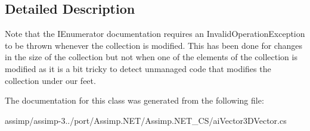 \subsection{Detailed Description}
Note that the I\+Enumerator documentation requires an Invalid\+Operation\+Exception to be thrown whenever the collection is modified. This has been done for changes in the size of the collection but not when one of the elements of the collection is modified as it is a bit tricky to detect unmanaged code that modifies the collection under our feet. 

The documentation for this class was generated from the following file\+:\begin{DoxyCompactItemize}
\item 
assimp/assimp-\/3../port/\+Assimp.\+N\+E\+T/\+Assimp.\+N\+E\+T\+\_\+\+C\+S/ai\+Vector3\+D\+Vector.\+cs\end{DoxyCompactItemize}

